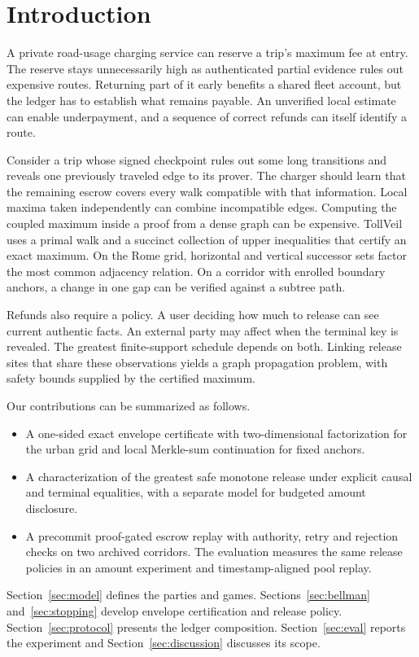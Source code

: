 \section{Introduction}
\label{sec:intro}

A private road-usage charging service can reserve a trip's maximum fee at entry. The reserve stays unnecessarily high as authenticated partial evidence rules out expensive routes. Returning part of it early benefits a shared fleet account, but the ledger has to establish what remains payable. An unverified local estimate can enable underpayment, and a sequence of correct refunds can itself identify a route.

Consider a trip whose signed checkpoint rules out some long transitions and reveals one previously traveled edge to its prover. The charger should learn that the remaining escrow covers every walk compatible with that information. Local maxima taken independently can combine incompatible edges. Computing the coupled maximum inside a proof from a dense graph can be expensive. TollVeil uses a primal walk and a succinct collection of upper inequalities that certify an exact maximum. On the Rome grid, horizontal and vertical successor sets factor the most common adjacency relation. On a corridor with enrolled boundary anchors, a change in one gap can be verified against a subtree path.

Refunds also require a policy. A user deciding how much to release can see current authentic facts. An external party may affect when the terminal key is revealed. The greatest finite-support schedule depends on both. Linking release sites that share these observations yields a graph propagation problem, with safety bounds supplied by the certified maximum.

Our contributions can be summarized as follows.

\begin{itemize}
\item A one-sided exact envelope certificate with two-dimensional factorization for the urban grid and local Merkle-sum continuation for fixed anchors.
\item A characterization of the greatest safe monotone release under explicit causal and terminal equalities, with a separate model for budgeted amount disclosure.
\item A precommit proof-gated escrow replay with authority, retry and rejection checks on two archived corridors. The evaluation measures the same release policies in an amount experiment and timestamp-aligned pool replay.
\end{itemize}

Section~\ref{sec:model} defines the parties and games. Sections~\ref{sec:bellman} and~\ref{sec:stopping} develop envelope certification and release policy. Section~\ref{sec:protocol} presents the ledger composition. Section~\ref{sec:eval} reports the experiment and Section~\ref{sec:discussion} discusses its scope.
